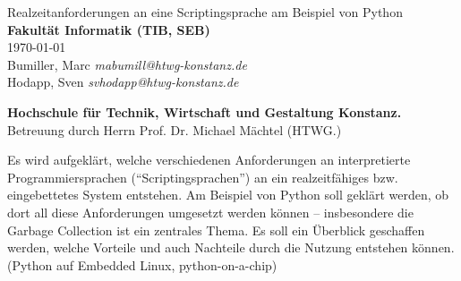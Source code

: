 \begin{titlepage}
	\vspace*{7cm}
	\begin{center}
		\Huge
		Realzeitanforderungen an eine Scriptingsprache am Beispiel von Python\\
		\vspace{1cm}
		\large
		\textbf{Fakultät Informatik (TIB, SEB)}\\
		\today\\
		\vspace{2cm}
		Bumiller, Marc \emph{mabumill@htwg-konstanz.de}\\
		Hodapp, Sven \emph{svhodapp@htwg-konstanz.de}\\
	\end{center}
	\normalsize
	\vfill
	\textbf{Hochschule für Technik, Wirtschaft und Gestaltung Konstanz.} Betreuung durch Herrn Prof. Dr. Michael Mächtel (HTWG.) 

Es wird aufgeklärt, welche verschiedenen Anforderungen an interpretierte Programmiersprachen ("`Scriptingsprachen"') an ein realzeitfähiges bzw. eingebettetes System entstehen. Am Beispiel von Python soll geklärt werden, ob dort all diese Anforderungen umgesetzt werden können -- insbesondere die Garbage Collection ist ein zentrales Thema. Es soll ein Überblick geschaffen werden, welche Vorteile und auch Nachteile durch die Nutzung entstehen können. (Python auf Embedded Linux, python-on-a-chip)

\end{titlepage}

